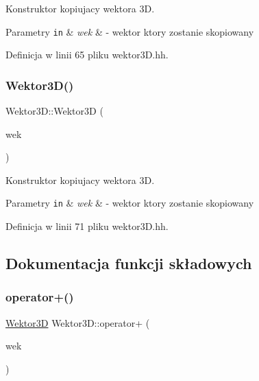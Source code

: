 Konstruktor kopiujacy wektora 3D. 


\begin{DoxyParams}[1]{Parametry}
\mbox{\tt in}  & {\em wek} & -\/ wektor ktory zostanie skopiowany \\
\hline
\end{DoxyParams}


Definicja w linii 65 pliku wektor3\+D.\+hh.

\mbox{\label{class_wektor3_d_a8e06c5739cc4ec3fe97177269872efd2}} 
\subsubsection{\texorpdfstring{Wektor3\+D()}{Wektor3D()}\hspace{0.1cm}{\footnotesize\ttfamily [5/5]}}
{\footnotesize\ttfamily Wektor3\+D\+::\+Wektor3D (\begin{DoxyParamCaption}\item[{const \hyperlink{class_wektor}{Wektor}$<$ double, 3 $>$ \&}]{wek }\end{DoxyParamCaption})\hspace{0.3cm}{\ttfamily [inline]}}



Konstruktor kopiujacy wektora 3D. 


\begin{DoxyParams}[1]{Parametry}
\mbox{\tt in}  & {\em wek} & -\/ wektor ktory zostanie skopiowany \\
\hline
\end{DoxyParams}


Definicja w linii 71 pliku wektor3\+D.\+hh.



\subsection{Dokumentacja funkcji składowych}
\mbox{\label{class_wektor3_d_a73141c168ee82a84e4522d12aae25bf1}} 
\subsubsection{\texorpdfstring{operator+()}{operator+()}}
{\footnotesize\ttfamily \hyperlink{class_wektor3_d}{Wektor3D} Wektor3\+D\+::operator+ (\begin{DoxyParamCaption}\item[{\hyperlink{class_wektor3_d}{Wektor3D}}]{wek }\end{DoxyParamCaption})}




